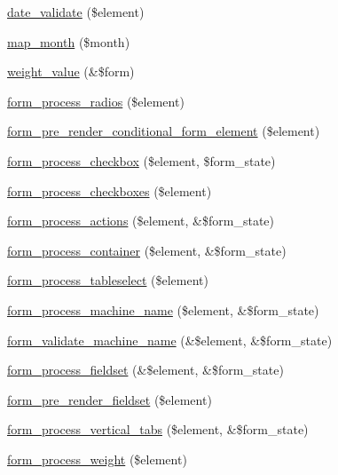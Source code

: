 \begin{DoxyCompactItemize}
\item 
\hyperlink{group__form__api_ga2a44cde876324e1333edb5fda5799c83}{date\_\-validate} (\$element)
\item 
\hyperlink{group__form__api_ga11e3cb67c8622b662acc4dff61e146a7}{map\_\-month} (\$month)
\item 
\hyperlink{group__form__api_gad80eba4897b841808cb71e6ba97603b2}{weight\_\-value} (\&\$form)
\item 
\hyperlink{group__form__api_ga61392e82fbc6eeeaf967b864da098ebc}{form\_\-process\_\-radios} (\$element)
\item 
\hyperlink{group__form__api_gac0bc3f3520adb84698903c4d0078fe2c}{form\_\-pre\_\-render\_\-conditional\_\-form\_\-element} (\$element)
\item 
\hyperlink{group__form__api_gab1a1b30f07888d0fa0de8b8222ee7994}{form\_\-process\_\-checkbox} (\$element, \$form\_\-state)
\item 
\hyperlink{group__form__api_ga916a0224fe0771749af2c05dfdb13df1}{form\_\-process\_\-checkboxes} (\$element)
\item 
\hyperlink{group__form__api_ga32dae38034437282e774ecf9436fcdaa}{form\_\-process\_\-actions} (\$element, \&\$form\_\-state)
\item 
\hyperlink{group__form__api_ga8a121eab47e8d864fcc62f8d8443f501}{form\_\-process\_\-container} (\$element, \&\$form\_\-state)
\item 
\hyperlink{group__form__api_ga4dc085d5191106b1a649c6df67feee30}{form\_\-process\_\-tableselect} (\$element)
\item 
\hyperlink{group__form__api_gacc2045f1fc86919221685bd809d22812}{form\_\-process\_\-machine\_\-name} (\$element, \&\$form\_\-state)
\item 
\hyperlink{group__form__api_ga22965a0e68fef7765e0eb2c475440e55}{form\_\-validate\_\-machine\_\-name} (\&\$element, \&\$form\_\-state)
\item 
\hyperlink{group__form__api_gae2acfa7f531c487ac930d3a819ee63b5}{form\_\-process\_\-fieldset} (\&\$element, \&\$form\_\-state)
\item 
\hyperlink{group__form__api_ga10c77d235a5451895a3d2862b1ff4e34}{form\_\-pre\_\-render\_\-fieldset} (\$element)
\item 
\hyperlink{group__form__api_gaad2f405e02e146b5cfe75912a67964d6}{form\_\-process\_\-vertical\_\-tabs} (\$element, \&\$form\_\-state)
\item 
\hyperlink{group__form__api_ga8d816602aa24f851579022bb37feac42}{form\_\-process\_\-weight} (\$element)
\item 

\end{DoxyCompactItemize}
